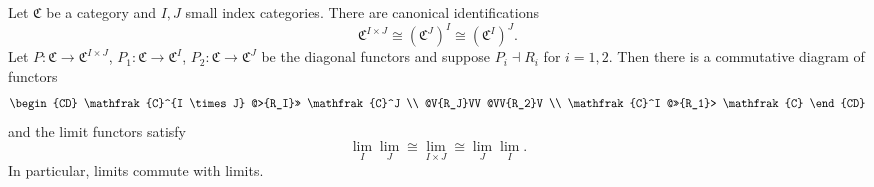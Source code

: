 Let $\mathfrak{C}$ be a category and $I, J$ small index categories. There are canonical identifications
$$
\mathfrak{C}^{I \times J} \cong (\mathfrak{C}^J)^I \cong (\mathfrak{C}^I)^J.
$$
Let $P : \mathfrak{C} \rightarrow \mathfrak{C}^{I \times J}$, $P_1 : \mathfrak{C} \rightarrow \mathfrak{C}^I$, $P_2 : \mathfrak{C} \rightarrow \mathfrak{C}^J$ be the diagonal functors and suppose $P_i \dashv R_i$ for $i = 1, 2$. Then there is a commutative diagram of functors
$$
\begin{CD}
\mathfrak{C}^{I \times J} @>{R_I}>> \mathfrak{C}^J \\
@V{R_J}VV @VV{R_2}V \\
\mathfrak{C}^I @>>{R_1}> \mathfrak{C}
\end{CD}
$$
and the limit functors satisfy
$$
\lim_{I} \lim_{J} \cong \lim_{I \times J} \cong \lim_{J} \lim_{I}.
$$
In particular, limits commute with limits.
